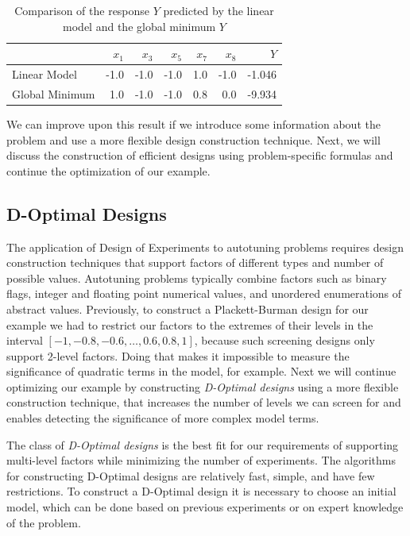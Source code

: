 \documentclass[conference]{IEEEtran}
\begin{document}
\begin{table}[ht]
\centering
\caption{Comparison of the response $Y$ predicted by the linear model and the global minimum $Y$}
\label{tab:linear_prediction_comparison}
\begingroup\footnotesize
\begin{tabular}{lrrrrrr}
  \toprule
 & $x_1$ & $x_3$ & $x_5$ & $x_7$ & $x_8$ & $Y$ \\
  \midrule
Linear Model & -1.0 & -1.0 & -1.0 & 1.0 & -1.0 & -1.046 \\
  Global Minimum & 1.0 & -1.0 & -1.0 & 0.8 & 0.0 & -9.934 \\
   \bottomrule
\end{tabular}
\endgroup
\end{table}

We can improve upon this result if we introduce some information about the
problem and use a more flexible design construction technique. Next, we will
discuss the construction of efficient designs using problem-specific formulas
and continue the optimization of our example.
\subsection{D-Optimal Designs}
\label{sec:org6eae78a}
The application of Design of Experiments to autotuning problems requires design
construction techniques that support factors of different types and number of
possible values. Autotuning problems typically combine factors such as binary
flags, integer and floating point numerical values, and unordered enumerations
of abstract values. Previously, to construct a Plackett-Burman design for our
example we had to restrict our factors to the extremes of their levels in the
interval \([-1, -0.8, -0.6,\dots,0.6, 0.8, 1]\), because such screening designs
only support 2-level factors. Doing that makes it impossible to measure the
significance of quadratic terms in the model, for example. Next we will continue
optimizing our example by constructing \emph{D-Optimal designs} using a more flexible
construction technique, that increases the number of levels we can screen for
and enables detecting the significance of more complex model terms.

The class of \emph{D-Optimal designs} is the best fit for our requirements of
supporting multi-level factors while minimizing the number of experiments. The
algorithms for constructing D-Optimal designs are relatively fast, simple, and
have few restrictions. To construct a D-Optimal design it is necessary to choose
an initial model, which can be done based on previous experiments or on expert
knowledge of the problem.
\end{document}
